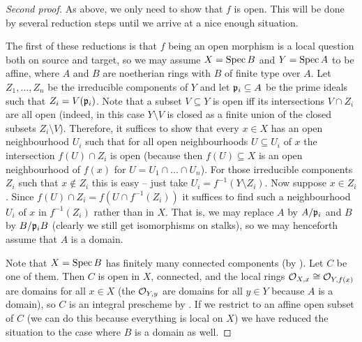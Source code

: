 \documentclass[a4paper,parskip=half,numbers=enddot, DIV=12]{scrreprt}
\begin{document}
\begin{proof}[Second proof]
	 As above, we only need to show that $f$ is open. This will be done by several reduction steps until we arrive at a nice enough situation.
	
	The first of these reductions is that $f$ being an open morphism is a local question both on source and target, so we may assume $X=\operatorname{Spec} B$ and $Y=\operatorname{Spec} A$ to be affine, where $A$ and $B$ are noetherian rings with $B$ of finite type over $A$. Let $Z_1,\ldots,Z_n$ be the irreducible components of $Y$ and let $\mathfrak{p}_i\subseteq A$ be the prime ideals such that $Z_i=V(\mathfrak{p}_i)$. Note that a subset $V\subseteq Y$ is open iff its intersections $V\cap Z_i$ are all open (indeed, in this case $Y\setminus V$ is closed as a finite union of the closed subsets $Z_i\setminus V$). Therefore, it suffices to show that every $x\in X$ has an open neighbourhood $U_i$ such that for all open neighbourhoods $U\subseteq U_i$ of $x$ the intersection $f(U)\cap Z_i$ is open (because then $f(U)\subseteq X$ is an open neighbourhood of $f(x)$ for $U=U_1\cap \ldots\cap U_n$). For those irreducible components $Z_i$ such that $x\notin Z_i$ this is easy -- just take $U_i=f^{-1}(Y\setminus Z_i)$. Now suppose $x\in Z_i$. Since $f(U)\cap Z_i=f\left(U\cap f^{-1}(Z_i)\right)$ it suffices to find such a neighbourhood $U_i$ of $x$ in $f^{-1}(Z_i)$ rather than in $X$. That is, we may replace $A$ by $A/\mathfrak{p}_i$ and $B$ by $B/\mathfrak{p}_i B$ (clearly we still get isomorphisms on stalks), so we may henceforth assume that $A$ is a domain.
	
	Note that $X=\operatorname{Spec} B$ has finitely many connected components (by \cite[Lemma~2.4.2]{alggeo1}). Let $C$ be one of them. Then $C$ is open in $X$, connected, and the local rings $\mathcal{O}_{X,x}\cong \mathcal{O}_{Y,f(x)}$ are domains for all $x\in X$ (the $\mathcal{O}_{Y,y}$ are domains for all $y\in Y$ because $A$ is a domain), so $C$ is an integral prescheme by \cite[Proposition~2.1.4]{alggeo1}. If we restrict to an affine open subset of $C$ (we can do this because everything is local on $X$) we have reduced the situation to the case where $B$ is a domain as well.
	

\end{proof}
\end{document}
